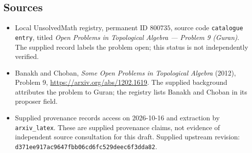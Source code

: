 \documentclass[11pt]{article}
\begin{document}
\subsection{Sources}
\begin{itemize}
\item Local UnsolvedMath registry, permanent ID \(800735\), source code \texttt{catalogue entry}, titled \emph{Open Problems in Topological Algebra --- Problem 9 (Guran)}. The supplied record labels the problem open; this status is not independently verified.
\item Banakh and Choban, \emph{Some Open Problems in Topological Algebra} (2012), Problem 9, \url{https://arxiv.org/abs/1202.1619}. The supplied background attributes the problem to Guran; the registry lists Banakh and Choban in its proposer field.
\item Supplied provenance records access on 2026-10-16 and extraction by \texttt{arxiv\_latex}. These are supplied provenance claims, not evidence of independent source consultation for this draft. Supplied upstream revision: \texttt{d371ee917ac9647fbb06cd6fc529deec6f3dda82}.
\end{itemize}
\end{document}
